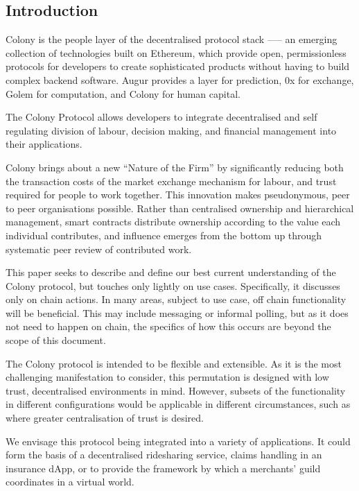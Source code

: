 \subsection*{Introduction}

Colony is the people layer of the decentralised protocol stack --— an emerging collection of technologies built on Ethereum, which provide open, permissionless protocols for developers to create sophisticated products without having to build complex backend software. Augur provides a layer for prediction, 0x for exchange, Golem for computation, and Colony for human capital.

The Colony Protocol allows developers to integrate decentralised and self regulating division of labour, decision making, and financial management into their applications.

Colony brings about a new ``Nature of the Firm'' \cite{The-Nature-of-the-Firm} by significantly reducing both the transaction costs of the market exchange mechanism for labour, and trust required for people to work together. This innovation makes pseudonymous, peer to peer organisations possible. Rather than centralised ownership and hierarchical management, smart contracts distribute ownership according to the value each individual contributes, and influence emerges from the bottom up through systematic peer review of contributed work.

This paper seeks to describe and define our best current understanding of the Colony protocol, but touches only lightly on use cases. Specifically, it discusses only on chain actions. In many areas, subject to use case, off chain functionality will be beneficial. This may include messaging or informal polling, but as it does not need to happen on chain, the specifics of how this occurs are beyond the scope of this document.

The Colony protocol is intended to be flexible and extensible. As it is the most challenging manifestation to consider, this permutation is designed with low trust, decentralised environments in mind. However, subsets of the functionality in different configurations would be applicable in different circumstances, such as where greater centralisation of trust is desired.

We envisage this protocol being integrated into a variety of applications. It could form the basis of a decentralised ridesharing service, claims handling in an insurance dApp, or to provide the framework by which a merchants’ guild coordinates in a virtual world.







